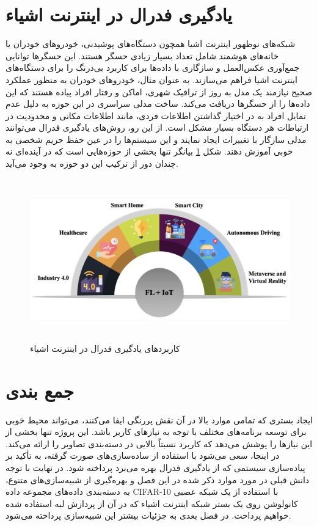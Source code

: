 \section{یادگیری فدرال در اینترنت اشیاء}

شبکه‌های نوظهور اینترنت اشیا همچون دستگاه‌های پوشیدنی، خودروهای خودران یا خانه‌های هوشمند شامل تعداد بسیار زیادی حسگر هستند. این حسگرها توانایی جمع‌آوری عکس‌العمل و سازگاری با داده‌ها برای کاربرد بی‌درنگ را برای دستگاه‌های اینترنت اشیا فراهم می‌سازند. به عنوان مثال، خودروهای خودران به منظور عملکرد صحیح نیازمند یک مدل به روز از ترافیک شهری، اماکن و رفتار افراد پیاده هستند که این داده‌ها را از حسگرها دریافت می‌کند. ساخت مدلی سراسری در این حوزه به دلیل عدم تمایل افراد به در اختیار گذاشتن اطلاعات فردی، مانند اطلاعات مکانی و محدودیت در ارتباطات هر دستگاه بسیار مشکل است. از این رو، روش‌های یادگیری فدرال می‌توانند مدلی سازگار با تغییرات ایجاد نمایند و این سیستم‌ها را در عین حفظ حریم شخصی به خوبی آموزش دهند. شکل \ref{iot} بیانگر تنها بخشی از حوزه‌هایی است که در آینده‌ای نه چندان دور از ترکیب این دو حوزه به وجود می‌آید.
\begin{figure}[H]
  \centering
  \includegraphics[height=7cm,width=13cm]{./IoT/IOT.png}
  \caption[کاربرد‌های یادگیری فدرال در اینترنت اشیاء]{ کاربرد‌های یادگیری فدرال در اینترنت اشیاء\cite{a10}}
  \label{iot}
  \centering
\end{figure}

\section{جمع بندی}
ایجاد بستری که تمامی موارد بالا در آن نقش پررنگی ایفا می‌کنند، می‌تواند محیط خوبی برای توسعه برنامه‌های مختلف با توجه به نیازهای کاربر باشد. این پروژه تنها بخشی از این نیاز‌ها را پوشش می‌دهد که کاربرد نسبتاً بالایی در دسته‌بندی تصاویر را ارائه می‌کند. در اینجا، سعی می‌شود با استفاده از ساده‌سازی‌های صورت گرفته، به تأکید بر پیاده‌سازی سیستمی که از یادگیری فدرال بهره می‌برد پرداخته شود. در نهایت با توجه دانش قبلی در مورد موارد ذکر شده در این فصل و بهره‌گیری از شبیه‌سازی‌های متنوع، به دسته‌بندی داده‌های مجموعه داده CIFAR-10 با استفاده از یک شبکه عصبی کانولوشن روی یک بستر شبکه اینترنت اشیاء که در آن از پردازش لبه استفاده شده خواهیم پرداخت. در فصل بعدی به جزئیات بیشتر این شبیه‌سازی پرداخته می‌شود.
